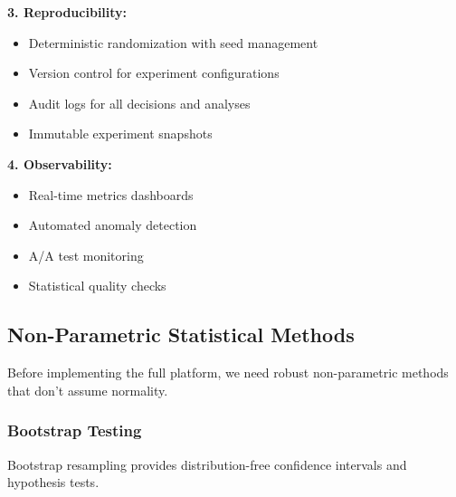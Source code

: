 \textbf{3. Reproducibility:}
\begin{itemize}
    \item Deterministic randomization with seed management
    \item Version control for experiment configurations
    \item Audit logs for all decisions and analyses
    \item Immutable experiment snapshots
\end{itemize}

\textbf{4. Observability:}
\begin{itemize}
    \item Real-time metrics dashboards
    \item Automated anomaly detection
    \item A/A test monitoring
    \item Statistical quality checks
\end{itemize}

\subsection{Non-Parametric Statistical Methods}

Before implementing the full platform, we need robust non-parametric methods that don't assume normality.

\subsubsection{Bootstrap Testing}

Bootstrap resampling provides distribution-free confidence intervals and hypothesis tests.

